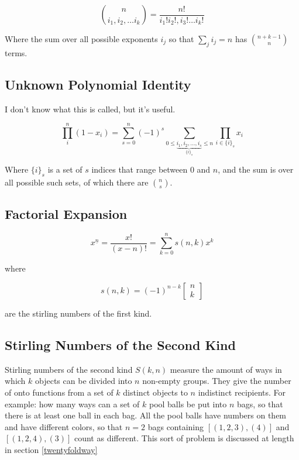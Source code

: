 \begin{equation}
{n \choose i_1,i_2,\hdots i_k} = \frac{n!}{i_1!i_2!,i_3!\hdots i_k!}
\end{equation}

Where the sum over all possible exponents $i_j$ so that $\sum_j i_j = n$ has ${n+k-1 \choose n}$ terms. 

\subsection{Unknown Polynomial Identity}
I don't know what this is called, but it's useful.

\begin{equation}
\prod_i^n (1-x_i) = \sum_{s=0}^{n} (-1)^s \sum_{0\leq \underbrace{i_1,i_2,...,i_s }_{\{i\}_s} \leq n} \prod_{i \in \{i\}_s} x_i
\end{equation}

Where $\{i\}_s$ is a set of $s$ indices that range between $0$ and $n$, and the sum is over all possible such sets, of which there are ${n \choose s}$.  


\subsection{Factorial Expansion}

\begin{equation}
x^{\underline{n}} = \frac{x!}{(x-n)!} = \sum_{k=0}^n s(n,k)x^k
\end{equation}

where

\begin{equation}
s(n,k) = (-1)^{n-k}\left[\begin{array}{c} n\\k \end{array}\right]
\end{equation}

are the stirling numbers of the first kind.



\subsection{Stirling Numbers of the Second Kind}
\label{sec:stirling2}

Stirling numbers of the second kind $S(k,n)$ measure the amount of ways in which $k$ objects can be divided into $n$ non-empty groups. They give the number of onto functions from a set of $k$ distinct objects to $n$ indistinct recipients. For example: how many ways can a set of $k$ pool balls be put into $n$ bags, so that there is at least one ball in each bag. All the pool balls have numbers on them and have different colors, so that $n=2$ bags containing $[(1,2,3), (4)] $ and $[(1,2,4),(3)]$ count as different. This sort of problem is discussed at length in section \ref{twentyfoldway}

